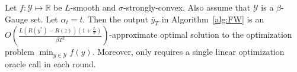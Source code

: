 \documentclass[pmlr]{jmlr} %
\def\reals{\mathbb{R}}
\def\reals{\mathbb{R}}
\def\argmin{\mathop{\arg\min}}
\def\balpha{\boldsymbol{\alpha}}
\def\BTRL{\textsc{BeTheRegularizedLeader}\xspace}
\def\OFTL{\textsc{Optimistic-FTL}\xspace}
\newcommand{\lr}[2]{\left\langle#1,#2\right\rangle}
\newcommand{\XX}{\mathcal{X}}
\newcommand{\YY}{\mathcal{Y}}
\newcommand{\pr}[1]{\left(#1\right)}
\begin{document}
\begin{corollary}\label{cor:FWcor} \label{thm:FW}
Let $f:\YY \mapsto \reals$ be $L$-smooth and $\sigma$-strongly-convex. Also assume that $\YY$ is a $\beta$-Gauge set. Let $\alpha_{t} = t$. Then the output $\bar{y}_{T}$ in Algorithm~\ref{alg:FW} is an $O\pr{ \frac{ L ( R(y^{*}) - R(z) )(1+\frac{L}{\sigma}) }{ \beta  T^{2}}}$-approximate optimal solution to the optimization problem $\min_{y \in \YY} f(y)$. Moreover,  only requires a single linear optimization oracle call in each round.
\end{corollary}







%


\end{document}
